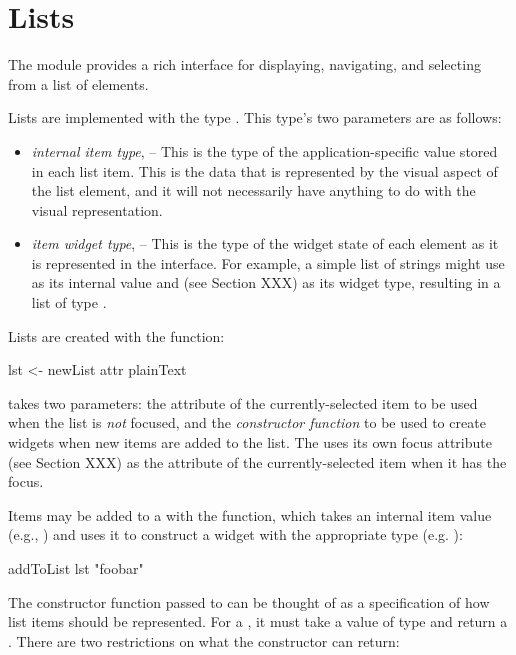 \section{Lists}

The  module provides a rich interface for displaying,
navigating, and selecting from a list of elements.

Lists are implemented with the type .  This type's two
parameters are as follows:

\begin{itemize}
\item \textit{internal item type},  -- This is the type of the
  application-specific value stored in each list item.  This is the
  data that is represented by the visual aspect of the list element,
  and it will not necessarily have anything to do with the visual
  representation.
\item \textit{item widget type},  -- This is the type of the
  widget state of each element as it is represented in the interface.
  For example, a simple list of strings might use  as its
  internal value and  (see Section XXX) as
  its widget type, resulting in a list of type .
\end{itemize}

Lists are created with the  function:

\begin{haskellcode}
 lst <- newList attr plainText
\end{haskellcode}

 takes two parameters: the attribute of the
currently-selected item to be used when the list is \textit{not}
focused, and the \textit{constructor function} to be used to create
widgets when new items are added to the list.  The  uses its
own focus attribute (see Section XXX) as the attribute of the
currently-selected item when it has the focus.

Items may be added to a  with the  function,
which takes an internal item value (e.g., ) and uses it to
construct a widget with the appropriate type (e.g. ):

\begin{haskellcode}
 addToList lst "foobar"
\end{haskellcode}

The constructor function passed to  can be thought of as a
specification of how list items should be represented.  For a , it must take a value of type  and return a .  There are two restrictions on what the constructor can return:

